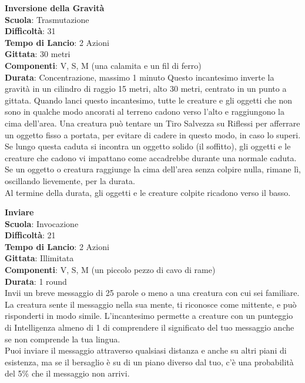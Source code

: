 \begin{multicols}{2}
\medskip\textbf{Inversione della Gravità}\\
\textbf{Scuola}: Trasmutazione\\
\textbf{Difficoltà}: 31\\
\textbf{Tempo di Lancio}: 2 Azioni\\
\textbf{Gittata}: 30 metri\\
\textbf{Componenti}: V, S, M (una calamita e un fil di ferro)\\
\textbf{Durata}: Concentrazione, massimo 1 minuto 
Questo incantesimo inverte la gravità in un cilindro di raggio 15 metri, alto 30 metri, centrato in un punto a gittata. Quando lanci questo incantesimo, tutte le creature e gli oggetti che non sono in qualche modo ancorati al terreno cadono verso l'alto e raggiungono la cima dell'area. Una creatura può tentare un Tiro Salvezza su Riflessi per afferrare un oggetto fisso a portata, per evitare di cadere in questo modo, in caso lo superi.\\
Se lungo questa caduta si incontra un oggetto solido (il soffitto), gli oggetti e le creature che cadono vi impattano come accadrebbe durante una normale caduta. Se un oggetto o creatura raggiunge la cima dell'area senza colpire nulla, rimane lì, oscillando lievemente, per la durata.\\
Al termine della durata, gli oggetti e le creature colpite ricadono verso il basso.

\medskip\textbf{Inviare}\\
\textbf{Scuola}: Invocazione\\
\textbf{Difficoltà}: 21\\
\textbf{Tempo di Lancio}: 2 Azioni\\
\textbf{Gittata}: Illimitata\\
\textbf{Componenti}: V, S, M (un piccolo pezzo di cavo di rame)\\
\textbf{Durata}: 1 round\\
Invii un breve messaggio di 25 parole o meno a una creatura con cui sei familiare. La creatura sente il messaggio nella sua mente, ti riconosce come mittente, e può risponderti in modo simile. L'incantesimo permette a creature con un punteggio di Intelligenza almeno di 1 di comprendere il significato del tuo messaggio anche se non comprende la tua lingua.\\
Puoi inviare il messaggio attraverso qualsiasi distanza e anche su altri piani di esistenza, ma se il bersaglio è su di un piano diverso dal tuo, c'è una probabilità del 5\% che il messaggio non arrivi.


\end{multicols}
